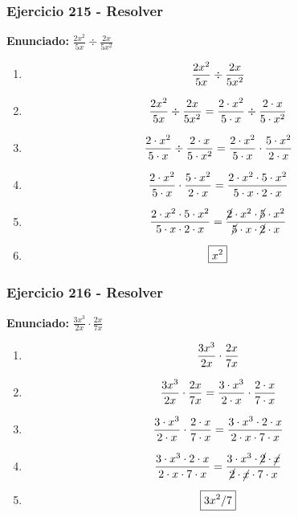 \documentclass[11pt,a4paper]{article}
\newcommand{\fitmath}[1]{%
\[
\setbox0=\hbox{$\displaystyle #1$}%
\ifdim\wd0>\linewidth
\resizebox{\linewidth}{!}{$\displaystyle #1$}%
\else
#1%
\fi
\]
}
\begin{document}
\vspace{0.12cm}
\subsubsection*{Ejercicio 215 - Resolver}
\textbf{Enunciado:} $ \frac{2 x^{2}}{5 x} \div \frac{2 x}{5 x^{2}} $\par
\begin{enumerate}[leftmargin=2em]
\item \fitmath{\frac{2 x^{2}}{5 x} \div \frac{2 x}{5 x^{2}}}
\item \fitmath{\frac{2 x^{2}}{5 x} \div \frac{2 x}{5 x^{2}}= \frac{2\cdot x^{2}}{5\cdot x} \div \frac{2\cdot x}{5\cdot x^{2}}}
\item \fitmath{\frac{2\cdot x^{2}}{5\cdot x}\div \frac{2\cdot x}{5\cdot x^{2}}= \frac{2\cdot x^{2}}{5\cdot x}\cdot \frac{5\cdot x^{2}}{2\cdot x}}
\item \fitmath{\frac{2\cdot x^{2}}{5\cdot x}\cdot \frac{5\cdot x^{2}}{2\cdot x}= \frac{2\cdot x^{2}\cdot 5\cdot x^{2}}{5\cdot x\cdot 2\cdot x}}
\item \fitmath{\frac{2\cdot x^{2}\cdot 5\cdot x^{2}}{5\cdot x\cdot 2\cdot x}= \frac{\cancel{2}\cdot x^{2}\cdot \cancel{5}\cdot x^{2}}{\cancel{5}\cdot x\cdot \cancel{2}\cdot x}}
\item \fitmath{\boxed{x^{2}}}
\end{enumerate}

\vspace{0.12cm}
\subsubsection*{Ejercicio 216 - Resolver}
\textbf{Enunciado:} $ \frac{3 x^{3}}{2 x} \cdot \frac{2 x}{7 x} $\par
\begin{enumerate}[leftmargin=2em]
\item \fitmath{\frac{3 x^{3}}{2 x} \cdot \frac{2 x}{7 x}}
\item \fitmath{\frac{3 x^{3}}{2 x} \cdot \frac{2 x}{7 x}= \frac{3\cdot x^{3}}{2\cdot x} \cdot \frac{2\cdot x}{7\cdot x}}
\item \fitmath{\frac{3\cdot x^{3}}{2\cdot x}\cdot \frac{2\cdot x}{7\cdot x}= \frac{3\cdot x^{3}\cdot 2\cdot x}{2\cdot x\cdot 7\cdot x}}
\item \fitmath{\frac{3\cdot x^{3}\cdot 2\cdot x}{2\cdot x\cdot 7\cdot x}= \frac{3\cdot x^{3}\cdot \cancel{2}\cdot \cancel{x}}{\cancel{2}\cdot \cancel{x}\cdot 7\cdot x}}
\item \fitmath{\boxed{3 x^{2} / 7}}
\end{enumerate}
\end{document}
